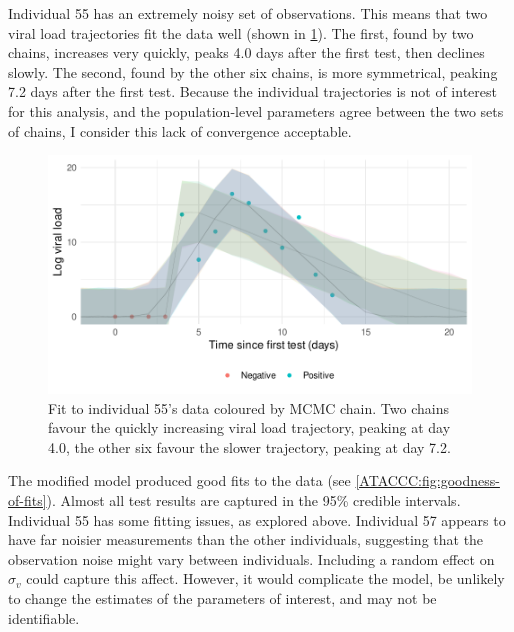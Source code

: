 \documentclass[thesis.tex]{subfiles}
\begin{document}
Individual 55 has an extremely noisy set of observations.
This means that two viral load trajectories fit the data well (shown in \cref{ATACCC:fig:individual-55}).
The first, found by two chains, increases very quickly, peaks 4.0 days after the first test, then declines slowly.
The second, found by the other six chains, is more symmetrical, peaking 7.2 days after the first test.
Because the individual trajectories is not of interest for this analysis, and the population-level parameters agree between the two sets of chains, I consider this lack of convergence acceptable.
\begin{figure}
  \centering \includegraphics{ATACCC/fit_individual_55}
  \caption[Goodness-of-fit for individual 55]{Fit to individual 55's data coloured by MCMC chain. Two chains favour the quickly increasing viral load trajectory, peaking at day 4.0, the other six favour the slower trajectory, peaking at day 7.2. \label{ATACCC:fig:individual-55}}
\end{figure}


The modified model produced good fits to the data (see \cref{ATACCC:fig:goodness-of-fits}).
Almost all test results are captured in the 95\% credible intervals.
Individual 55 has some fitting issues, as explored above.
Individual 57 appears to have far noisier measurements than the other individuals, suggesting that the observation noise might vary between individuals.
Including a random effect on $\sigma_v$ could capture this affect.
However, it would complicate the model, be unlikely to change the estimates of the parameters of interest, and may not be identifiable.
\end{document}

